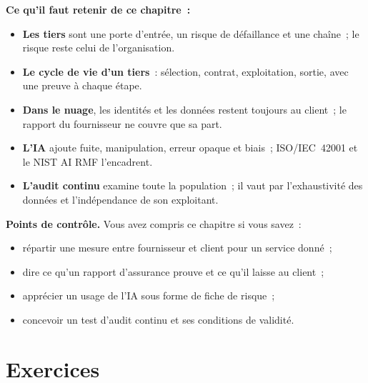 \begin{boxresume}
\textbf{Ce qu'il faut retenir de ce chapitre~:}
\begin{itemize}
    \item \textbf{Les tiers} sont une porte d'entrée, un risque de
          défaillance et une chaîne~; le risque reste celui de
          l'organisation.
    \item \textbf{Le cycle de vie d'un tiers}~: sélection, contrat,
          exploitation, sortie, avec une preuve à chaque étape.
    \item \textbf{Dans le nuage}, les identités et les données restent
          toujours au client~; le rapport du fournisseur ne couvre que sa
          part.
    \item \textbf{L'IA} ajoute fuite, manipulation, erreur opaque et biais~;
          ISO/IEC~42001 et le NIST AI RMF l'encadrent.
    \item \textbf{L'audit continu} examine toute la population~; il vaut par
          l'exhaustivité des données et l'indépendance de son exploitant.
\end{itemize}
\end{boxresume}

\begin{boxinfo}
\textbf{Points de contrôle.} Vous avez compris ce chapitre si vous savez~:
\begin{itemize}
    \item répartir une mesure entre fournisseur et client pour un service
          donné~;
    \item dire ce qu'un rapport d'assurance prouve et ce qu'il laisse au
          client~;
    \item apprécier un usage de l'IA sous forme de fiche de risque~;
    \item concevoir un test d'audit continu et ses conditions de validité.
\end{itemize}
\end{boxinfo}

\section*{Exercices}

